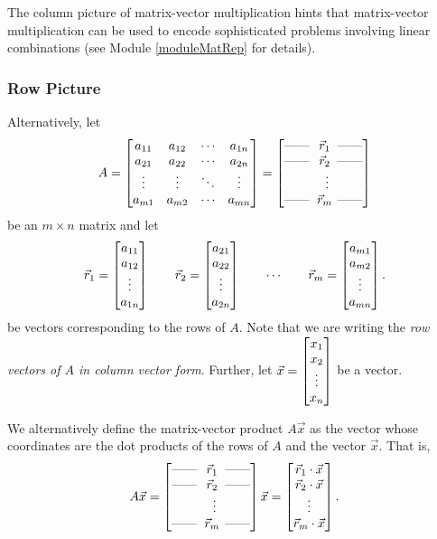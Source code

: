 The column picture of matrix-vector multiplication hints that matrix-vector multiplication can be used
to encode sophisticated problems involving linear combinations (see Module \ref{moduleMatRep} for details).

\subsubsection*{Row Picture}

Alternatively, let
\[
	A=
	\matc{
				{a_{11}} & {a_{12}} & {\cdots} & {a_{1n}}\\
				{a_{21}} & {a_{22}} & {\cdots} & {a_{2n}}\\
				{\vdots} & {\vdots} & {\ddots} & {\vdots}\\
				{a_{m1}} & {a_{m2}} & {\cdots} & {a_{mn}}
				}=
			\matc{\hdash&\hspace{-4pt}\vec r_1&\hspace{-6pt}\hdash\\
				\hdash&\hspace{-4pt}\vec r_2&\hspace{-6pt}\hdash\\
				&\vdots&\\
				\hdash&\hspace{-4pt}\vec r_m&\hspace{-6pt}\hdash}
\]
be an $m\times n$ matrix and let 
\[
	\vec r_1=\begin{bmatrix}a_{11}\\a_{12}\\\vdots\\a_{1n}\end{bmatrix}\qquad
	\vec r_2=\begin{bmatrix}a_{21}\\a_{22}\\\vdots\\a_{2n}\end{bmatrix}\qquad\cdots\qquad
	\vec r_m=\begin{bmatrix}a_{m1}\\a_{m2}\\\vdots\\a_{mn}\end{bmatrix}.
\]
be vectors corresponding to the rows of $A$. Note that we are writing the \emph{row vectors of $A$ in column vector form}. 
Further, let $\vec x=\begin{bmatrix}x_1\\x_2\\\vdots\\x_n\end{bmatrix}$ be a vector.

We alternatively define the matrix-vector product $A\vec x$ as the vector whose coordinates are the dot products of the
rows of $A$ and the vector $\vec x$. That is,
\[
	A\vec x =
			\matc{\hdash&\hspace{-4pt}\vec r_1&\hspace{-6pt}\hdash\\
				\hdash&\hspace{-4pt}\vec r_2&\hspace{-6pt}\hdash\\
				&\vdots&\\
				\hdash&\hspace{-4pt}\vec r_m&\hspace{-6pt}\hdash}
			\vec x
		=
	\matc{\vec r_1\cdot \vec x\\\vec r_2\cdot\vec x\\\vdots\\\vec r_m\cdot \vec x}.
\]

